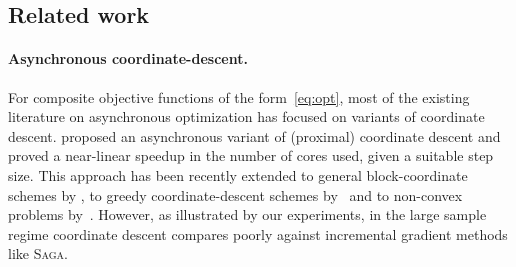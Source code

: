 \documentclass{article}
\newcommand{\SAGA}{\textsc{Saga}}
\begin{document}
\subsection{Related work}


\paragraph{Asynchronous coordinate-descent.} For composite objective functions of the form~\eqref{eq:opt}, most of the existing literature on asynchronous optimization has focused on variants of coordinate descent.
\citet{liu2015asynchronous2} proposed an asynchronous variant of (proximal) coordinate descent and proved a near-linear speedup in the number of cores used, given a suitable step size.
This approach has been recently extended to general block-coordinate schemes by \citet{peng2016arock}, to greedy coordinate-descent schemes by~\citet{you2016asynchronous} and to non-convex problems by~\citet{apalm_davis}. However, as illustrated by our experiments, in the large sample regime coordinate descent compares poorly against incremental gradient methods like \SAGA.
\end{document}
